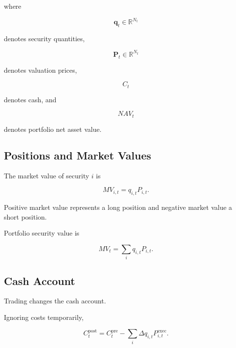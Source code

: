 \documentclass[11pt,a4paper]{article}
\begin{document}
where

\begin{equation}
\mathbf{q}_t
\in
\mathbb{R}^{N_t}
\end{equation}

denotes security quantities,

\begin{equation}
\mathbf{P}_t
\in
\mathbb{R}^{N_t}
\end{equation}

denotes valuation prices,

\begin{equation}
C_t
\end{equation}

denotes cash, and

\begin{equation}
NAV_t
\end{equation}

denotes portfolio net asset value.


\subsection{Positions and Market Values}

The market value of security $i$ is

\begin{equation}
\boxed{
MV_{i,t}
=
q_{i,t}
P_{i,t}.
}
\end{equation}

Positive market value represents a long position and negative market value a
short position.

Portfolio security value is

\begin{equation}
\boxed{
MV_t
=
\sum_i
q_{i,t}
P_{i,t}.
}
\end{equation}


\subsection{Cash Account}

Trading changes the cash account.

Ignoring costs temporarily,

\begin{equation}
\boxed{
C_t^{\mathrm{post}}
=
C_t^{\mathrm{pre}}
-
\sum_i
\Delta q_{i,t}
P_{i,t}^{\mathrm{exec}}.
}
\end{equation}
\end{document}
